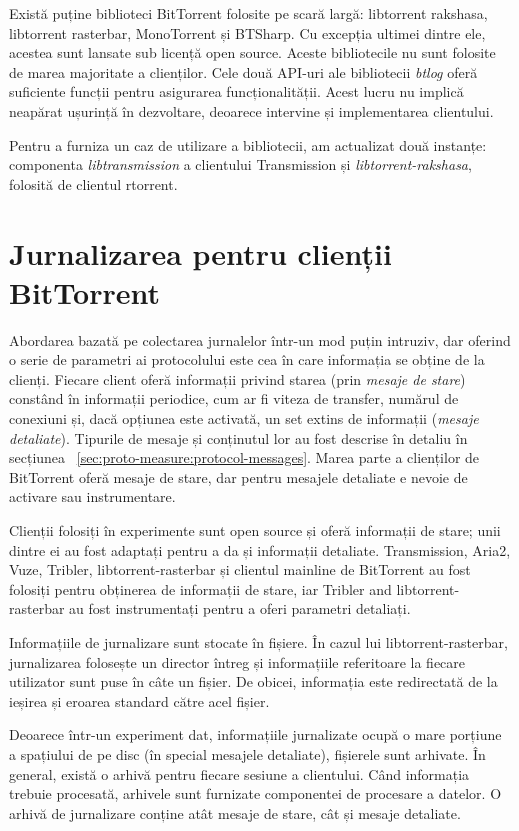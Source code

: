 Există puține biblioteci BitTorrent folosite pe scară largă:
libtorrent rakshasa, libtorrent rasterbar, MonoTorrent și BTSharp.
Cu excepția ultimei dintre ele, acestea sunt lansate sub licență open source.
Aceste bibliotecile nu sunt folosite de marea majoritate a clienților. Cele două
API-uri ale bibliotecii \textit{btlog} oferă suficiente funcții pentru
asigurarea funcționalității. Acest lucru nu implică neapărat ușurință în
dezvoltare, deoarece intervine și implementarea clientului.

Pentru a furniza un caz de utilizare a bibliotecii, am actualizat două
instanțe: componenta \textit{libtransmission} a clientului Transmission
și \textit{libtorrent-rakshasa}, folosită de clientul rtorrent.

\section{Jurnalizarea pentru clienții BitTorrent}
\label{sec:proto-measure:log-collect}

Abordarea bazată pe colectarea jurnalelor într-un mod puțin intruziv, dar
oferind o serie de parametri ai protocolului este cea în care informația se
obține de la clienți. Fiecare client oferă informații privind starea
(prin \textit{mesaje de stare}) constând în informații periodice, cum ar
fi viteza de transfer, numărul de conexiuni și, dacă opțiunea este activată,
un set extins de informații (\textit{mesaje detaliate}). Tipurile de mesaje și
conținutul lor au fost descrise în detaliu în secțiunea ~\ref{sec:proto-measure:protocol-messages}. Marea parte a clienților de BitTorrent oferă mesaje de
stare, dar pentru mesajele detaliate e nevoie de activare sau instrumentare.

Clienții folosiți în experimente sunt open source și oferă informații de
stare; unii dintre ei au fost adaptați pentru a da și informații detaliate.
Transmission, Aria2, Vuze, Tribler, libtorrent-rasterbar și clientul mainline
de BitTorrent au fost folosiți pentru obținerea de informații de stare, iar
Tribler and libtorrent-rasterbar au fost instrumentați pentru a oferi
parametri detaliați.

Informațiile de jurnalizare sunt stocate în fișiere. În cazul lui
libtorrent-rasterbar, jurnalizarea folosește un director întreg și
informațiile referitoare la fiecare utilizator sunt puse în câte un fișier.
De obicei, informația este redirectată de la ieșirea și eroarea standard
către acel fișier.

Deoarece într-un experiment dat, informațiile jurnalizate ocupă o mare porțiune
a spațiului de pe disc (în special mesajele detaliate), fișierele sunt
arhivate. În general, există o arhivă pentru fiecare sesiune a clientului. Când
informația trebuie procesată, arhivele sunt furnizate componentei de procesare
a datelor. O arhivă de jurnalizare conține atât mesaje de stare, cât și
mesaje detaliate.

